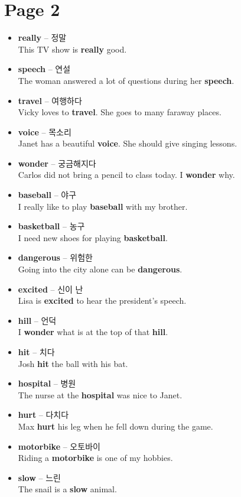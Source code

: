 \documentclass[12pt]{article}
\begin{document}
\newpage
\section*{Page 2}
\begin{itemize}
    \item \textbf{really} -- 정말 \\
    This TV show is \textbf{really} good.
    \item \textbf{speech} -- 연설 \\
    The woman answered a lot of questions during her \textbf{speech}.
    \item \textbf{travel} -- 여행하다 \\
    Vicky loves to \textbf{travel}. She goes to many faraway places.
    \item \textbf{voice} -- 목소리 \\
    Janet has a beautiful \textbf{voice}. She should give singing lessons.
    \item \textbf{wonder} -- 궁금해지다 \\
    Carlos did not bring a pencil to class today. I \textbf{wonder} why.
    \item \textbf{baseball} -- 야구 \\
    I really like to play \textbf{baseball} with my brother.
    \item \textbf{basketball} -- 농구 \\
    I need new shoes for playing \textbf{basketball}.
    \item \textbf{dangerous} -- 위험한 \\
    Going into the city alone can be \textbf{dangerous}.
    \item \textbf{excited} -- 신이 난 \\
    Lisa is \textbf{excited} to hear the president's speech.
    \item \textbf{hill} -- 언덕 \\
    I \textbf{wonder} what is at the top of that \textbf{hill}.
    \item \textbf{hit} -- 치다 \\
    Josh \textbf{hit} the ball with his bat.
    \item \textbf{hospital} -- 병원 \\
    The nurse at the \textbf{hospital} was nice to Janet.
    \item \textbf{hurt} -- 다치다 \\
    Max \textbf{hurt} his leg when he fell down during the game.
    \item \textbf{motorbike} -- 오토바이 \\
    Riding a \textbf{motorbike} is one of my hobbies.
    \item \textbf{slow} -- 느린 \\
    The snail is a \textbf{slow} animal.
\end{itemize}
\end{document}
